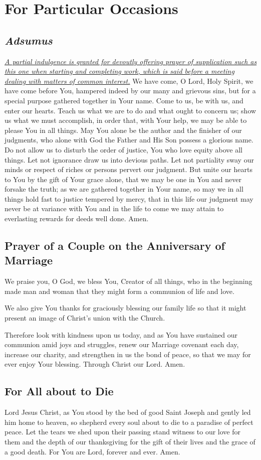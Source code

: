 \documentclass[12pt]{article}
\newcommand{\prayersection}[1]{\section{#1}}
\newcommand{\prayertitle}[1]{\subsection{#1}}
\newcommand{\indulgencedprayertitle}[1]{\prayertitle{#1 \protect\kreuz}}
\newcommand{\foreign}[1]{\textsl{#1}}
\newcommand{\note}[1]{{\small{\textsl{#1}}}\newline}
\newcommand{\linkednote}[2]{\hyperlink{#1}{\note{#2}}}
\begin{document}
\prayersection{For Particular Occasions}
\indulgencedprayertitle{\foreign{Adsumus}}
\linkednote{grant26}{A partial indulgence is granted for devoutly offering prayer of supplication such as this one when starting and completing work, which is said before a meeting dealing with matters of common interest.}
We have come, O Lord, Holy Spirit, we have come before You, hampered indeed by our many and grievous sins, but for a special purpose gathered together in Your name.
Come to us, be with us, and enter our hearts.
Teach us what we are to do and what ought to concern us;
show us what we must accomplish, in order that, with Your help, we may be able to please You in all things.
May You alone be the author and the finisher of our judgments, who alone with God the Father and His Son possess a glorious name.
Do not allow us to disturb the order of justice, You who love equity above all things.
Let not ignorance draw us into devious paths.
Let not partiality sway our minds or respect of riches or persons pervert our judgment.
But unite our hearts to You by the gift of Your grace alone, that we may be one in You and never forsake the truth;
as we are gathered together in Your name, so may we in all things hold fast to justice tempered by mercy, that in this life our judgment may never be at variance with You and in the life to come we may attain to everlasting rewards for deeds well done.
Amen.

\prayertitle{Prayer of a Couple on the Anniversary of Marriage}
We praise you, O God, we bless You, Creator of all things, who in the beginning made man and woman that they might form a communion of life and love.

We also give You thanks for graciously blessing our family life so that it might present an image of Christ's union with the Church.

Therefore look with kindness upon us today, and as You have sustained our communion amid joys and struggles, renew our Marriage covenant each day, increase our charity, and strengthen in us the bond of peace, so that we may for ever enjoy Your blessing.
Through Christ our Lord. Amen.

\prayertitle{For All about to Die}
Lord Jesus Christ, as You stood by the bed of good Saint Joseph and gently led him home to heaven, so shepherd every soul about to die to a paradise of perfect peace.
Let the tears we shed upon their passing stand witness to our love for them and the depth of our thanksgiving for the gift of their lives and the grace of a good death.
For You are Lord, forever and ever.
Amen.
\end{document}
